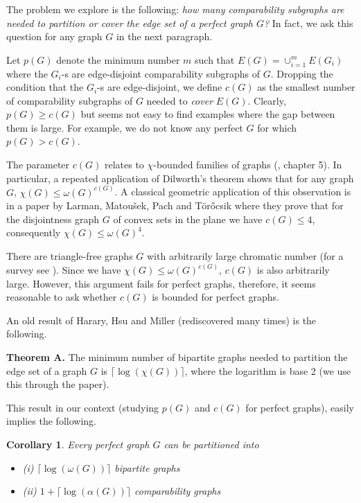 \documentclass[12pt]{article}
\newtheorem{corollary}[theorem]{Corollary}
\begin{document}
The problem we explore is the following: {\em how many comparability subgraphs are needed to partition or cover the edge set of a perfect graph $G$?}
In fact, we ask this question for any graph $G$ in the next paragraph.

Let $p(G)$ denote the minimum number $m$ such that $E(G)=\cup_{i=1}^m E(G_i)$ where the $G_i$-s are edge-disjoint comparability subgraphs of $G$.
Dropping  the condition that the $G_i$-s are edge-disjoint, we define $c(G)$ as the smallest number of comparability subgraphs of $G$ needed to {\em cover} $E(G)$.
Clearly, $p(G)\ge c(G)$ but seems not easy to find examples where the gap between them is large. For example, we do not know any perfect $G$ for which $p(G)>c(G)$.

The parameter $c(G)$ relates to $\chi$-bounded families of graphs (\cite{GY}, chapter 5).
In particular, a repeated application of Dilworth's theorem shows that for any graph $G$, $\chi(G)\le \omega(G)^{c(G)}$.
A classical geometric application of this observation is
in a paper by Larman, Matou\v sek, Pach and T\"or\H ocsik \cite{LMPT}
where they prove that for the disjointness graph $G$  of convex sets in the plane
we have  $c(G)\le 4$, consequently $\chi(G)\le \omega(G)^{4}$.


There are triangle-free graphs $G$ with arbitrarily large chromatic number (for a survey see \cite{SS20}).
Since we have $\chi(G)\le \omega(G)^{c(G)}$,
$c(G)$ is also arbitrarily large.
However, this argument fails for perfect graphs,
therefore,
it seems reasonable to ask whether $c(G)$ is bounded
for perfect graphs.



An old result of Harary, Hsu and Miller \cite{HHM} (rediscovered many times)  is the following.

\noindent
    {\bf Theorem A.} The minimum number of bipartite graphs needed to partition the edge set of a graph $G$ is
    $\lceil\log(\chi(G))\rceil$, where the logarithm is base 2 (we use this through the paper).


This result in our context (studying $p(G)$ and $c(G)$ for perfect graphs), easily implies the following.
\begin{corollary}\label{genupbound}  Every perfect graph $G$ can be partitioned into
\begin{itemize}
\item (i) $\lceil\log(\omega(G))\rceil$ bipartite graphs
\item (ii) $1+\lceil\log(\alpha(G))\rceil$ comparability graphs
\end{itemize}
\end{corollary}
\end{document}
